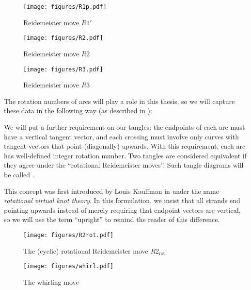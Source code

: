 \begin{figure}[h]
        \centering
        \texttt{[image: figures/R1p.pdf]}
        \caption{Reidemeister move $R1'$}
        \label{fig:R1p}
\end{figure}
\begin{figure}[h]
        \centering
        \texttt{[image: figures/R2.pdf]}
        \caption{Reidemeister move $R2$}
        \label{fig:R2}
\end{figure}
\begin{figure}[h]
        \centering
        \texttt{[image: figures/R3.pdf]}
        \caption{Reidemeister move $R3$}
        \label{fig:R3}
\end{figure}

The rotation numbers of arcs will play a role in this thesis, so we will capture
these data in the following way (as described in \cite{BV23}):

\begin{definition}
        We will put a further requirement on our tangles: the endpoints of each
        arc must have a vertical tangent vector, and each crossing must involve
        only curves with tangent vectors that point (diagonally) upwards. With
        this requirement, each arc has well-defined integer rotation number. Two
        tangles are considered equivalent if they agree under the
        \enquote{rotational Reidemeister moves}. Such tangle diagrams will be
        called .
\end{definition}
\begin{remark}
        This concept was first introduced by Louis Kauffman in \cite{LK} under
        the name \emph{rotational virtual knot theory}. In this formulation, we
        insist that all strands end pointing upwards instead of merely requiring
        that endpoint vectors are vertical, so we will use the term
        \enquote{upright} to remind the reader of this difference.
\end{remark}
\begin{figure}[h]
        \centering
        \texttt{[image: figures/R2rot.pdf]}
        \caption{The (cyclic) rotational Reidemeister move $R2_{\text{rot}}$}
        \label{fig:R2rot}
\end{figure}
\begin{figure}[h]
        \centering
        \texttt{[image: figures/whirl.pdf]}
        \caption{The whirling move}
        \label{fig:whirl}
\end{figure}

